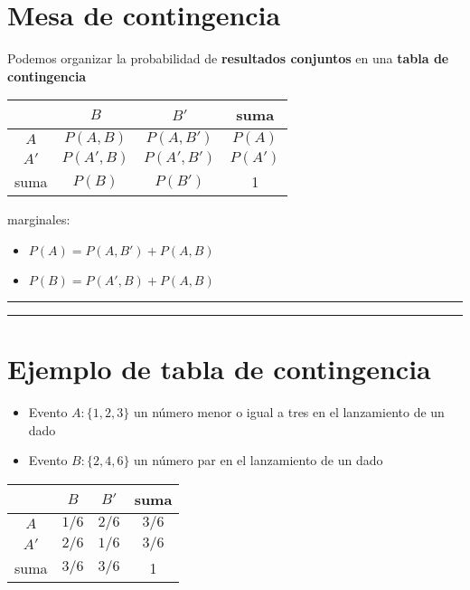 \documentclass[
]{book}
\providecommand{\tightlist}{%
  \setlength{\itemsep}{0pt}\setlength{\parskip}{0pt}}
\begin{document}
\hypertarget{mesa-de-contingencia}{%
\section{Mesa de contingencia}\label{mesa-de-contingencia}}

Podemos organizar la probabilidad de \textbf{resultados conjuntos} en una \textbf{tabla de contingencia}

\begin{longtable}[]{@{}cccc@{}}
\toprule
& \(B\) & \(B'\) & suma \\
\midrule
\endhead
\(A\) & \(P(A, B )\) & \(P(A, B' )\) & \(P(A)\) \\
\(A'\) & \(P(A', B )\) & \(P(A', B' )\) & \(P(A')\) \\
suma & \(P(B)\) & \(P(B')\) & 1 \\
\bottomrule
\end{longtable}

marginales:

\begin{itemize}
\tightlist
\item
  \(P(A)=P(A, B') + P(A, B)\)
\item
  \(P(B)=P(A', B) +P(A, B)\)
\end{itemize}

\begin{center}\rule{0.5\linewidth}{0.5pt}\end{center}

\begin{center}\rule{0.5\linewidth}{0.5pt}\end{center}

\hypertarget{ejemplo-de-tabla-de-contingencia}{%
\section{Ejemplo de tabla de contingencia}\label{ejemplo-de-tabla-de-contingencia}}

\begin{itemize}
\tightlist
\item
  Evento \(A:\{1,2,3\}\) un número menor o igual a tres en el lanzamiento de un dado
\item
  Evento \(B:\{2,4,6\}\) un número par en el lanzamiento de un dado
\end{itemize}

\begin{longtable}[]{@{}cccc@{}}
\toprule
& \(B\) & \(B'\) & suma \\
\midrule
\endhead
\(A\) & \(1/6\) & \(2/6\) & \(3/6\) \\
\(A'\) & \(2/6\) & \(1/6\) & \(3/6\) \\
suma & \(3/6\) & \(3/6\) & 1 \\
\bottomrule
\end{longtable}
\end{document}
